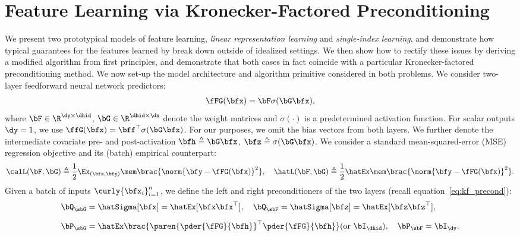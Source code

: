 \section{Feature Learning via Kronecker-Factored Preconditioning}

We present two prototypical models of feature learning, \textit{linear representation learning} and \textit{single-index learning}, and demonstrate how typical guarantees for the features learned by \SGD break down outside of idealized settings. We then show how to rectify these issues by deriving a modified algorithm from first principles, and demonstrate that both cases in fact coincide with a particular Kronecker-factored preconditioning method. We now set-up the model architecture and algorithm primitive considered in both problems. We consider two-layer feedforward neural network predictors:
\begin{align}\label{eq:two_layer_net}
    \fFG(\bfx) = \bF \sigma(\bG \bfx),
\end{align}
where $\bF \in \R^{\dy \times \dhid}$, $\bG \in \R^{\dhid \times \dx}$ denote the weight matrices and $\sigma(\cdot)$ is a predetermined activation function. For scalar outputs $\dy = 1$, we use $\ffG(\bfx) = \bff^\top \sigma(\bG \bfx)$. For our purposes, we omit the bias vectors from both layers. We further denote the intermediate covariate pre- and post-activation $\bfh \triangleq \bG \bfx$, $\bfz \triangleq \sigma(\bG \bfx)$. We consider a standard mean-squared-error (MSE) regression objective and its (batch) empirical counterpart:
\begin{align}\label{eq:regression_loss}
    \calL(\bF, \bG) \triangleq \frac{1}{2} \Ex_{(\bfx, \bfy)}\mem\brac{\norm{\bfy - \fFG(\bfx)}^2}, \quad
    \hatL(\bF, \bG) \triangleq \frac{1}{2} \hatEx \mem\brac{\norm{\bfy - \fFG(\bfx)}^2}.
\end{align}
Given a batch of inputs $\curly{\bfx_i}_{i=1}^n$, we define the left and right preconditioners of the two layers (recall equation~\eqref{eq:kf_precond}):
\begin{align}\label{eq:precond}
    \begin{split}
        &\bQ_\sbG = \hatSigma[\bfx] =  \hatEx[\bfx \bfx^\top], \quad \bQ_\sbF = \hatSigma[\bfz] = \hatEx[\bfz\bfz^\top],\\[0.2cm]
        &\bP_\sbG = \hatEx\brac{\paren{\pder{\fFG}{\bfh}}^\top \pder{\fFG}{\bfh}} (\text{or } \bI_{\dhid}), \quad \bP_{\sbF} = \bI_{\dy}.
    \end{split}
\end{align}
